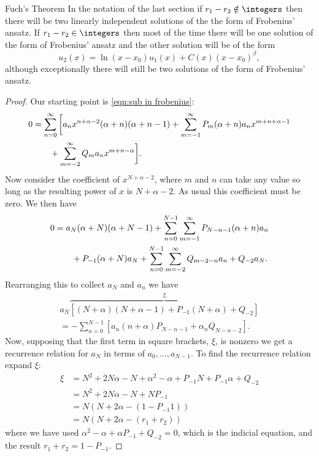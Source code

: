 \documentclass[fleqn]{NotesClass}
\begin{document}
    \begin{thm}{Fuch's Theorem}{}
        In the notation of the last section if \(r_1 - r_2 \notin \integers\) then there will be two linearly independent solutions of the the form of Frobenius' ansatz.
        If \(r_1 - r_2 \in \integers\) then most of the time there will be one solution of the form of Frobenius' ansatz and the other solution will be of the form
        \begin{equation}
            u_2(x) = \ln(x - x_0)u_1(x) + C(x)(x - x_0)^\beta,
        \end{equation}
        although exceptionally there will still be two solutions of the form of Frobenius' ansatz.
        \begin{proof}
            Our starting point is \cref{eqn:sub in frobenius}:
            \begin{align}
                0 &= \sum_{n=0}^{\infty} \bigg[ a_nx^{n+\alpha-2}(\alpha + n)(\alpha + n - 1) + \sum_{m=-1}^{\infty} P_m(\alpha + n)a_nx^{m + n + \alpha - 1}\notag\\
                &\qquad+ \sum_{m=-2}^{\infty} Q_ma_nx^{m+n-\alpha} \bigg].
            \end{align}
            Now consider the coefficient of \(x^{N + \alpha - 2}\), where \(m\) and \(n\) can take any value so long as the resulting power of \(x\) is \(N + \alpha - 2\).
            As usual this coefficient must be zero.
            We then have
            \begin{align}
                0 &= a_N(\alpha + N)(\alpha + N - 1) + \sum_{n=0}^{N - 1}\sum_{m=-1}^{\infty} P_{N - n - 1}(\alpha + n)a_n\notag\\
                &\qquad+ P_{-1}(\alpha + N)a_N + \sum_{n=0}^{N - 1}\sum_{m=-2}^{\infty} Q_{m - 2 - n} a_n + Q_{-2}a_N.
            \end{align}
            Rearranging this to collect \(a_N\) and \(a_n\) we have
            \begin{multline}
                a_N\overbrace{[(N + \alpha)(N + \alpha - 1) + P_{-1}(N + \alpha) + Q_{-2}]}^{\xi}\\
                = -\sum_{n=0}^{N-1}[a_n(n + \alpha)P_{N - n - 1} + \alpha_nQ_{N - n - 2}].
            \end{multline}
            Now, supposing that the first term in square brackets, \(\xi\), is nonzero we get a recurrence relation for \(a_N\) in terms of \(a_0, \dotsc, a_{N - 1}\).
            To find the recurrence relation expand \(\xi\):
            \begin{align}
                \xi &= N^2 + 2N\alpha - N + \alpha^2 - \alpha + P_{-1}N + P_{-1}\alpha + Q_{-2}\\
                &= N^2 + 2N\alpha - N + NP_{-1}\\
                &= N(N + 2\alpha - (1 - P_{-1}1))\\
                &= N(N + 2\alpha - (r_1 + r_2))
            \end{align}
            where we have used \(\alpha^2 - \alpha + \alpha P_{-1} + Q_{-2} = 0\), which is the indicial equation, and the result \(r_1 + r_2 = 1 - P_{-1}\).
            

\end{proof}
\end{thm}
\end{document}
